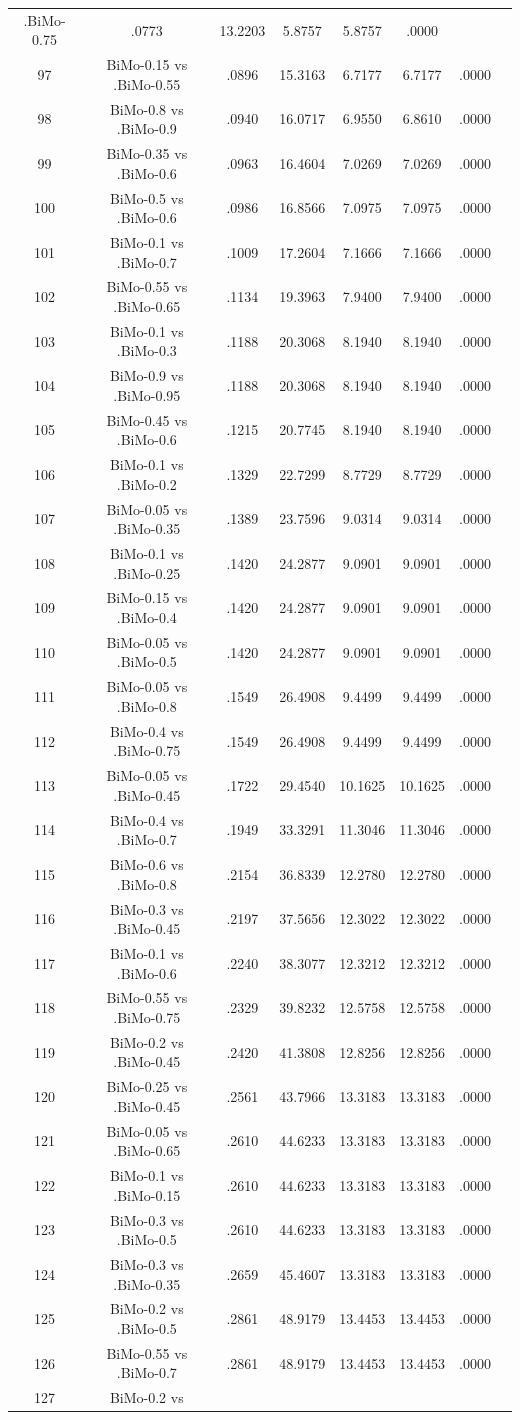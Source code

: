 \documentclass[a4paper,10pt]{article}
\begin{document}
\begin{landscape}
\begin{table}[!htp]
\begin{tabular}{cccccccc}
.BiMo-0.75&.0773&13.2203&5.8757&5.8757&.0000\\97&BiMo-0.15 vs .BiMo-0.55&.0896&15.3163&6.7177&6.7177&.0000\\98&BiMo-0.8 vs .BiMo-0.9&.0940&16.0717&6.9550&6.8610&.0000\\99&BiMo-0.35 vs .BiMo-0.6&.0963&16.4604&7.0269&7.0269&.0000\\100&BiMo-0.5 vs .BiMo-0.6&.0986&16.8566&7.0975&7.0975&.0000\\101&BiMo-0.1 vs .BiMo-0.7&.1009&17.2604&7.1666&7.1666&.0000\\102&BiMo-0.55 vs .BiMo-0.65&.1134&19.3963&7.9400&7.9400&.0000\\103&BiMo-0.1 vs .BiMo-0.3&.1188&20.3068&8.1940&8.1940&.0000\\104&BiMo-0.9 vs .BiMo-0.95&.1188&20.3068&8.1940&8.1940&.0000\\105&BiMo-0.45 vs .BiMo-0.6&.1215&20.7745&8.1940&8.1940&.0000\\106&BiMo-0.1 vs .BiMo-0.2&.1329&22.7299&8.7729&8.7729&.0000\\107&BiMo-0.05 vs .BiMo-0.35&.1389&23.7596&9.0314&9.0314&.0000\\108&BiMo-0.1 vs .BiMo-0.25&.1420&24.2877&9.0901&9.0901&.0000\\109&BiMo-0.15 vs .BiMo-0.4&.1420&24.2877&9.0901&9.0901&.0000\\110&BiMo-0.05 vs .BiMo-0.5&.1420&24.2877&9.0901&9.0901&.0000\\111&BiMo-0.05 vs .BiMo-0.8&.1549&26.4908&9.4499&9.4499&.0000\\112&BiMo-0.4 vs .BiMo-0.75&.1549&26.4908&9.4499&9.4499&.0000\\113&BiMo-0.05 vs .BiMo-0.45&.1722&29.4540&10.1625&10.1625&.0000\\114&BiMo-0.4 vs .BiMo-0.7&.1949&33.3291&11.3046&11.3046&.0000\\115&BiMo-0.6 vs .BiMo-0.8&.2154&36.8339&12.2780&12.2780&.0000\\116&BiMo-0.3 vs .BiMo-0.45&.2197&37.5656&12.3022&12.3022&.0000\\117&BiMo-0.1 vs .BiMo-0.6&.2240&38.3077&12.3212&12.3212&.0000\\118&BiMo-0.55 vs .BiMo-0.75&.2329&39.8232&12.5758&12.5758&.0000\\119&BiMo-0.2 vs .BiMo-0.45&.2420&41.3808&12.8256&12.8256&.0000\\120&BiMo-0.25 vs .BiMo-0.45&.2561&43.7966&13.3183&13.3183&.0000\\121&BiMo-0.05 vs .BiMo-0.65&.2610&44.6233&13.3183&13.3183&.0000\\122&BiMo-0.1 vs .BiMo-0.15&.2610&44.6233&13.3183&13.3183&.0000\\123&BiMo-0.3 vs .BiMo-0.5&.2610&44.6233&13.3183&13.3183&.0000\\124&BiMo-0.3 vs .BiMo-0.35&.2659&45.4607&13.3183&13.3183&.0000\\125&BiMo-0.2 vs .BiMo-0.5&.2861&48.9179&13.4453&13.4453&.0000\\126&BiMo-0.55 vs .BiMo-0.7&.2861&48.9179&13.4453&13.4453&.0000\\127&BiMo-0.2 vs 
\end{tabular}
\end{table}
\end{landscape}
\end{document}
